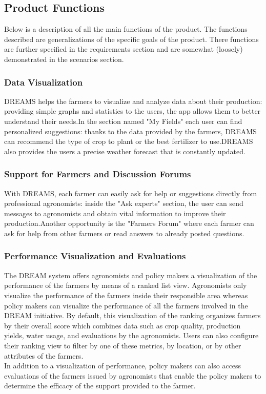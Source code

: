 \subsection{Product Functions}
\begin{flushleft}

Below is a description of all the main functions of the product. The functions described are generalizations of the specific goals of the product. There functions are further specified in the requirements section and are somewhat (loosely) demonstrated in the scenarios section. 

\subsubsection{Data Visualization}
DREAMS helps the farmers to visualize and analyze data about their production: providing simple graphs and statistics to the users, the app allows them to better understand their needs.In the section named "My Fields" each user can find personalized suggestions: thanks to the data provided by the farmers, DREAMS can recommend the type of crop to plant or the best fertilizer to use.DREAMS also provides the users a precise weather forecast that is constantly updated.

\subsubsection{Support for Farmers and Discussion Forums}
With DREAMS, each farmer can easily ask for help or suggestions directly from professional agronomists: inside the "Ask experts" section, the user can send messages to agronomists and obtain vital information to improve their production.Another opportunity is the "Farmers Forum" where each farmer can ask for help from other farmers or read answers to already posted questions.

\subsubsection{Performance Visualization and Evaluations}
The DREAM system offers agronomists and policy makers a visualization of the performance of the farmers by means of a ranked list view. Agronomists only visualize the performance of the farmers inside their responsible area whereas policy makers can visualize the performance of all the farmers involved in the DREAM initiative. By default, this visualization of the ranking organizes farmers by their overall score which combines data such as crop quality, production yields, water usage, and evaluations by the agronomists. Users can also configure their ranking view to filter by one of these metrics, by location, or by other attributes of the farmers. \\
\smallskip
In addition to a visualization of performance, policy makers can also access evaluations of the farmers issued by agronomists that enable the policy makers to determine the efficacy of the support provided to the farmer. 


\end{flushleft}

